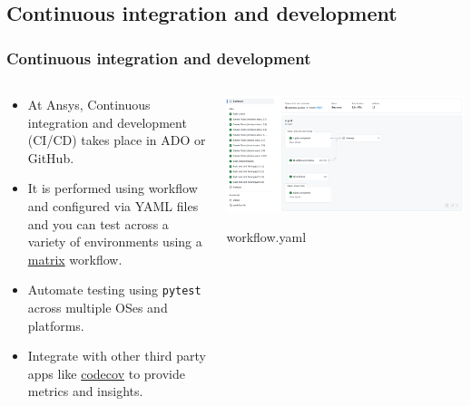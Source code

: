 \documentclass[t]{beamer}
\begin{document}
\subsection{Continuous integration and development}
\begin{frame}[fragile=singleslide]
  \frametitle{Continuous integration and development}

  \vspace{-11pt}

  \begin{columns}[T]
    \begin{column}{.55\textwidth}
      \begin{itemize}
      \item At Ansys, Continuous integration and development (CI/CD) takes place in
        ADO or GitHub.
      \item It is performed using workflow and configured via YAML files and you can test across a variety of environments using a \href{https://docs.github.com/en/actions/using-jobs/using-a-matrix-for-your-jobs}{matrix} workflow.
      \item Automate testing using \texttt{pytest} across multiple OSes and platforms.
      \item Integrate with other third party apps like \href{https://app.codecov.io/gh/pyansys/pymapdl}{codecov} to provide metrics and insights.
      \end{itemize}
    \end{column}

    \begin{column}{.5\textwidth}
      \centering
      \href{https://github.com/pyansys/pymapdl/actions}{\includegraphics[width=1.0\textwidth]{figures/gh_actions_pipeline.png}}
      \begin{exampleblock}{\small workflow.yaml}
        \inputminted[fontsize=\scriptsize]{yaml}{code/workflow.yml}
      \end{exampleblock}

    \end{column}
  \end{columns}

\end{frame}
\end{document}
